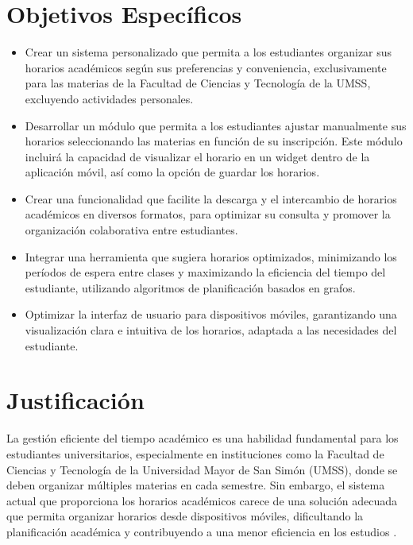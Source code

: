 \section{Objetivos Específicos}
\begin{itemize}
    \item Crear un sistema personalizado que permita a los estudiantes organizar sus horarios académicos según sus preferencias y conveniencia, exclusivamente para las materias de la Facultad de Ciencias y Tecnología de la UMSS, excluyendo actividades personales.

    \item Desarrollar un módulo que permita a los estudiantes ajustar manualmente sus horarios seleccionando las materias en función de su inscripción. Este módulo incluirá la capacidad de visualizar el horario en un widget dentro de la aplicación móvil, así como la opción de guardar los horarios.

    \item Crear una funcionalidad que facilite la descarga y el intercambio de horarios académicos en diversos formatos, para optimizar su consulta y promover la organización colaborativa entre estudiantes.
    \item Integrar una herramienta que sugiera horarios optimizados, minimizando los períodos de espera entre clases y maximizando la eficiencia del tiempo del estudiante, utilizando algoritmos de planificación basados en grafos.

    \item Optimizar la interfaz de usuario para dispositivos móviles, garantizando una visualización clara e intuitiva de los horarios, adaptada a las necesidades del estudiante.
\end{itemize}

\section{Justificación}
\label{sec:Justificación}

La gestión eficiente del tiempo académico es una habilidad fundamental para los estudiantes universitarios, especialmente en instituciones como la Facultad de Ciencias y Tecnología de la Universidad Mayor de San Simón (UMSS), donde se deben organizar múltiples materias en cada semestre. Sin embargo, el sistema actual que proporciona los horarios académicos carece de una solución adecuada que permita organizar horarios desde dispositivos móviles, dificultando la planificación académica y contribuyendo a una menor eficiencia en los estudios \cite{cappuccino_umss}.

